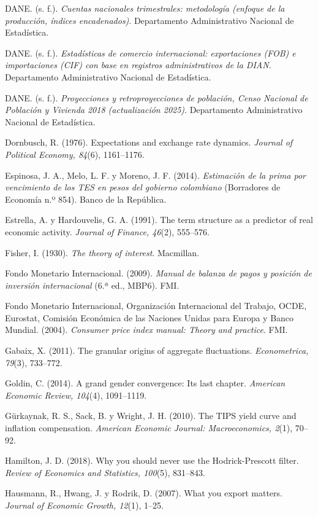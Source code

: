 DANE. (s. f.). \emph{Cuentas nacionales trimestrales: metodología
(enfoque de la producción, índices encadenados)}. Departamento
Administrativo Nacional de Estadística.

DANE. (s. f.). \emph{Estadísticas de comercio internacional:
exportaciones (FOB) e importaciones (CIF) con base en registros
administrativos de la DIAN}. Departamento Administrativo Nacional de
Estadística.

DANE. (s. f.). \emph{Proyecciones y retroproyecciones de población,
Censo Nacional de Población y Vivienda 2018 (actualización 2025)}.
Departamento Administrativo Nacional de Estadística.

Dornbusch, R. (1976). Expectations and exchange rate dynamics.
\emph{Journal of Political Economy, 84}(6), 1161--1176.

Espinosa, J. A., Melo, L. F. y Moreno, J. F. (2014). \emph{Estimación de
la prima por vencimiento de los TES en pesos del gobierno colombiano}
(Borradores de Economía n.º 854). Banco de la República.

Estrella, A. y Hardouvelis, G. A. (1991). The term structure as a
predictor of real economic activity. \emph{Journal of Finance, 46}(2),
555--576.

Fisher, I. (1930). \emph{The theory of interest}. Macmillan.

Fondo Monetario Internacional. (2009). \emph{Manual de balanza de pagos
y posición de inversión internacional} (6.ª ed., MBP6). FMI.

Fondo Monetario Internacional, Organización Internacional del Trabajo,
OCDE, Eurostat, Comisión Económica de las Naciones Unidas para Europa y
Banco Mundial. (2004). \emph{Consumer price index manual: Theory and
practice}. FMI.

Gabaix, X. (2011). The granular origins of aggregate fluctuations.
\emph{Econometrica, 79}(3), 733--772.

Goldin, C. (2014). A grand gender convergence: Its last chapter.
\emph{American Economic Review, 104}(4), 1091--1119.

Gürkaynak, R. S., Sack, B. y Wright, J. H. (2010). The TIPS yield curve
and inflation compensation. \emph{American Economic Journal:
Macroeconomics, 2}(1), 70--92.

Hamilton, J. D. (2018). Why you should never use the Hodrick-Prescott
filter. \emph{Review of Economics and Statistics, 100}(5), 831--843.

Hausmann, R., Hwang, J. y Rodrik, D. (2007). What you export matters.
\emph{Journal of Economic Growth, 12}(1), 1--25.

